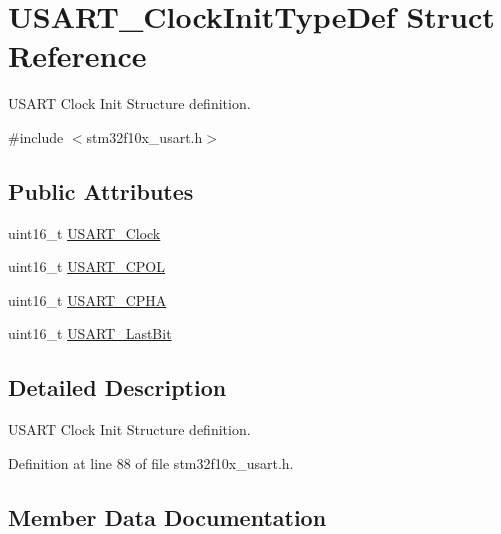 \hypertarget{struct_u_s_a_r_t___clock_init_type_def}{}\section{U\+S\+A\+R\+T\+\_\+\+Clock\+Init\+Type\+Def Struct Reference}
\label{struct_u_s_a_r_t___clock_init_type_def}


U\+S\+A\+RT Clock Init Structure definition.  




{\ttfamily \#include $<$stm32f10x\+\_\+usart.\+h$>$}

\subsection*{Public Attributes}
\begin{DoxyCompactItemize}
\item 
uint16\+\_\+t \hyperlink{struct_u_s_a_r_t___clock_init_type_def_a229ba7c3f9a4d6d56513e6899f6c6693}{U\+S\+A\+R\+T\+\_\+\+Clock}
\item 
uint16\+\_\+t \hyperlink{struct_u_s_a_r_t___clock_init_type_def_a01450cba8a40cf9a624b25979dc6aa77}{U\+S\+A\+R\+T\+\_\+\+C\+P\+OL}
\item 
uint16\+\_\+t \hyperlink{struct_u_s_a_r_t___clock_init_type_def_abda3a2172bd5819e1c207dc0d1c822d8}{U\+S\+A\+R\+T\+\_\+\+C\+P\+HA}
\item 
uint16\+\_\+t \hyperlink{struct_u_s_a_r_t___clock_init_type_def_ab1b28d63d2be6e57849666d78a4467bd}{U\+S\+A\+R\+T\+\_\+\+Last\+Bit}
\end{DoxyCompactItemize}


\subsection{Detailed Description}
U\+S\+A\+RT Clock Init Structure definition. 

Definition at line 88 of file stm32f10x\+\_\+usart.\+h.



\subsection{Member Data Documentation}
\mbox{\label{struct_u_s_a_r_t___clock_init_type_def_a229ba7c3f9a4d6d56513e6899f6c6693}} 
